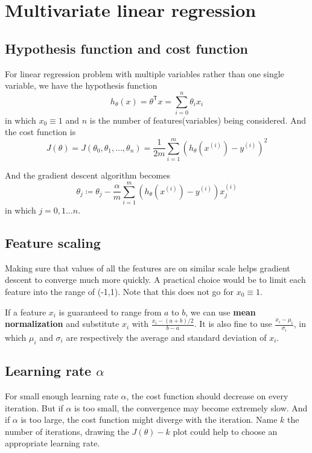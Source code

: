 \ifx\PREAMBLE\undefined


\fi
\section{Multivariate linear regression}
\subsection{Hypothesis function and cost function}
For linear regression problem with multiple variables rather than one single variable, we have the hypothesis function
\begin{equation}
h_{\theta}(x) = \theta^{\mathsf T}x = \sum\limits_{i=0}^{n}\theta_ix_i 
\end{equation}
in which $x_0 \equiv 1$ and $n$ is the number of features(variables) being considered. And the cost function is 
\begin{equation}
J(\theta) = J(\theta_0, \theta_1, \dots , \theta_n) = \frac{1}{2m}\sum\limits_{i=1}^{m}\left(h_{\theta}(x^{(i)}) - y^{(i)}\right)^2
\end{equation}

And the gradient descent algorithm becomes
\begin{equation}
\theta_j \coloneqq \theta_j - \frac{\alpha}{m}\sum\limits_{i=1}^{m}\left(h_{\theta}(x^{(i)}) - y^{(i)}\right)x^{(i)}_j
\end{equation}
in which $j = 0, 1 \dots n$.
\subsection{Feature scaling}
Making sure that values of all the features are on similar scale helps gradient descent to converge much more quickly. A practical choice would be to limit each feature into the range of (-1,1). Note that this does not go for $x_0\equiv1$.

If a feature $x_i$ is guaranteed to range from $a$ to $b$, we can use {\bf mean normalization} and substitute $x_i$ with $\frac{x_i-(a+b)/2}{b-a}$. It is also fine to use $\frac{x_i-\mu_i}{\sigma_i}$, in which $\mu_i$ and $\sigma_i$ are respectively the average and standard deviation of $x_i$.
\subsection{Learning rate \texorpdfstring{$\alpha$}{}}
For small enough learning rate $\alpha$, the cost function should decrease on every iteration. But if $\alpha$ is too small, the convergence may become extremely slow. And if $\alpha$ is too large, the cost function might diverge with the iteration. Name $k$ the number of iterations, drawing the $J(\theta)-k$ plot could help to choose an appropriate learning rate.
